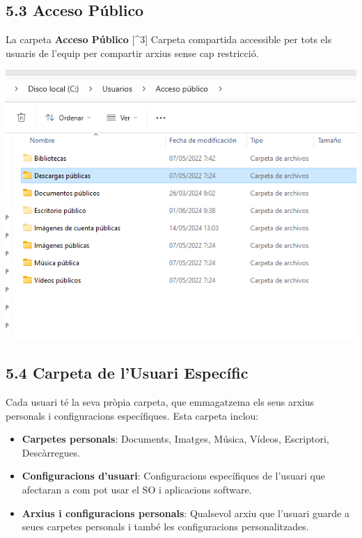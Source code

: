 \documentclass[
  a4paper,
]{article}
\providecommand{\tightlist}{%
  \setlength{\itemsep}{0pt}\setlength{\parskip}{0pt}}
\begin{document}
\subsection{5.3 Acceso Público}\label{acceso-puxfablico}

La carpeta \textbf{Acceso Público} {[}\^{}3{]} Carpeta compartida
accessible per tots els usuaris de l'equip per compartir arxius sense
cap restricció.

\includegraphics{png/CarpetesPublico.png}

\subsection{5.4 Carpeta de l'Usuari
Específic}\label{carpeta-de-lusuari-especuxedfic}

Cada usuari té la seva pròpia carpeta, que emmagatzema els seus arxius
personals i configuracions específiques. Esta carpeta inclou:

\begin{itemize}
\tightlist
\item
  \textbf{Carpetes personals}: Documents, Imatges, Música, Vídeos,
  Escriptori, Descàrregues.
\item
  \textbf{Configuracions d'usuari}: Configuracions específiques de
  l'usuari que afectaran a com pot usar el SO i aplicacions software.
\item
  \textbf{Arxius i configuracions personals}: Qualsevol arxiu que
  l'usuari guarde a seues carpetes personals i també les configuracions
  personalitzades.
\end{itemize}
\end{document}

